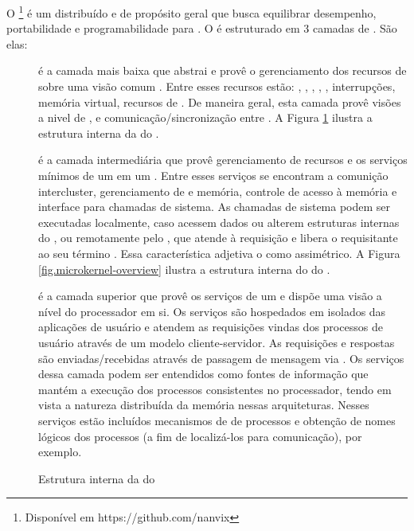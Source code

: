 O \nanvix\footnote{Disponível em https://github.com/nanvix} é um \os distribuído e de propósito geral que busca equilibrar desempenho, portabilidade e programabilidade para \lws \cite{penna:sbesc19}. O \nanvix é estruturado em 3 camadas de . São elas:
\begin{description}
    \item [\nanvix \hal]
         é a camada mais baixa que abstrai e provê o gerenciamento dos recursos de \hardware sobre uma visão comum \cite{penna:hal}. Entre esses recursos estão: \cores, \tlbs, \cache, \mmu, \noc, interrupções, memória virtual, recursos de \io. De maneira geral, esta camada provê visões a nivel de \core, \cluster e comunicação/sincronização entre \clusters \cite{penna:thesis}. A Figura \ref{fig.hal-overview} ilustra a estrutura interna da \hal do \nanvix.
    \item [\nanvix \Assymetric \Microkernel]
        é a camada intermediária que provê gerenciamento de recursos e os serviços mínimos de um \os em um \cluster. Entre esses serviços se encontram a comunição intercluster, gerenciamento de \threads e memória, controle de acesso à memória e interface para chamadas de sistema. As chamadas de sistema podem ser executadas localmente, caso acessem dados \rdo ou alterem estruturas internas do \core, ou remotamente pelo \mcore, que atende à requisição e libera o \score requisitante ao seu término \cite{penna:thesis}. Essa característica adjetiva o \microkernel como assimétrico. A Figura \ref{fig.microkernel-overview} ilustra a estrutura interna do \microkernel do \nanvix.    
    \item [\nanvix \Multikernel]
        é a camada superior que provê os serviços de um \os e dispõe uma visão a nível do processador em si. Os serviços são hospedados em \clusters \ie isolados das aplicações de usuário e atendem as requisições vindas dos processos de usuário através de um modelo cliente-servidor. As requisições e respostas são enviadas/recebidas através de passagem de mensagem via \noc. Os serviços dessa camada podem ser entendidos como fontes de informação que mantém a execução dos processos consistentes no processador, tendo em vista a natureza distribuída da memória nessas arquiteturas. Nesses serviços estão incluídos mecanismos de \spawn de processos e obtenção de nomes lógicos dos processos (a fim de localizá-los para comunicação), por exemplo.
\end{description}

\begin{figure}[bt]
    \centering
    
    \caption{Estrutura interna da \hal do \nanvix \cite{penna:thesis}}\label{fig.hal-overview}
\end{figure}

